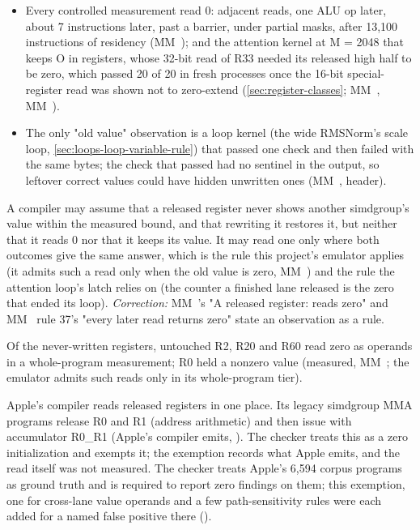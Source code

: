 \begin{itemize}
\item Every controlled measurement read 0: adjacent reads, one ALU op later, about 7 instructions later, past a barrier,
  under partial masks, after 13,100 instructions of residency (MM~); and the attention kernel at M = 2048 that keeps O in registers, whose
  32-bit read of R33 needed its released high half to be zero, which passed 20 of 20 in fresh processes once
  the 16-bit special-register read was shown not to zero-extend (\cref{sec:register-classes}; MM~, MM~).
\item The only "old value" observation is a loop kernel (the wide RMSNorm's scale loop, \cref{sec:loops-loop-variable-rule}) that passed one check
  and then failed with the same bytes; the check that passed had no sentinel in the output, so leftover correct values
  could have hidden unwritten ones (MM~,  header).
\end{itemize}

A compiler may assume that a released register never shows another simdgroup's value within the measured bound,
and that rewriting it restores it, but neither that it reads 0 nor that it keeps its value. It may read one only
where both outcomes give the same answer, which
is the rule this project's emulator applies (it admits such a read only when the old value is zero, MM~) and the
rule the attention loop's latch relies on (the counter a finished lane released is the zero that ended its loop).
\emph{Correction:} MM~'s "A released register: reads zero" and MM~ rule 37's "every later read returns zero" state an
observation as a rule.

Of the never-written registers, untouched R2, R20 and R60 read zero as operands in a whole-program measurement; R0 held a
nonzero value (measured, MM~; the emulator admits such reads only in its whole-program tier).

Apple's compiler reads released registers in one place. Its legacy simdgroup MMA programs release R0 and R1
(address arithmetic) and then issue  with accumulator R0\_R1 (Apple's compiler
emits, ). The checker treats this as a zero initialization and exempts it; the exemption records what Apple
emits, and the read itself was not measured. The checker treats Apple's 6,594 corpus programs as ground
truth and is required to report zero findings on them; this exemption, one for cross-lane value operands and a few
path-sensitivity rules were each added for a named false positive there ().

